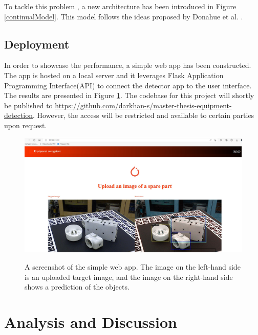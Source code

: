 \documentclass[english, 12pt, a4paper, elec, utf8, a-1b, online]{aaltothesis}
\begin{document}
To tackle this problem , a new architecture has been introduced in Figure \ref{continualModel}. This model follows the ideas proposed by Donahue et al. \cite{Donahue2013}.  


\subsection{Deployment}
In order to showcase the performance, a simple web app has been constructed. The app is hosted on a local server and it leverages Flask Application Programming Interface(API) to connect the detector app to the user interface. The results are presented in Figure \ref{demo}. The codebase for this project will shortly be published to \url{https://github.com/darkhan-s/master-thesis-equipment-detection}. However, the access will be restricted and available to certain parties upon request.  

\begin{figure}[htb]
	\begin{center}
		\includegraphics[width=16cm]{./demo.png}
	\end{center}
	\caption{A screenshot of the simple web app. The image on the left-hand side is an uploaded target image, and the image on the right-hand side shows a prediction of the objects.}
	\begin{center}
		\label{demo}
	\end{center}
\end{figure}
\FloatBarrier





\clearpage

\section{Analysis and Discussion} 
\end{document}
